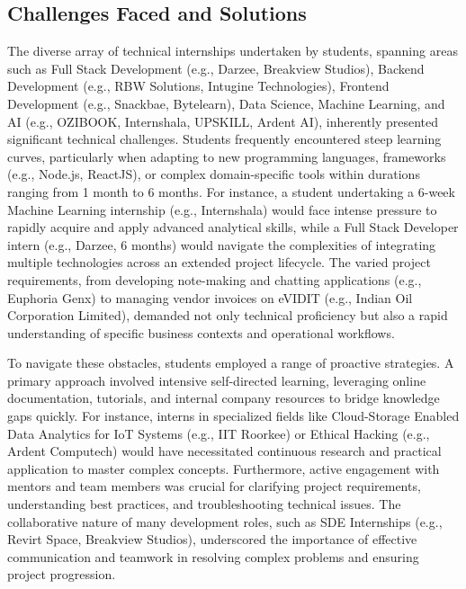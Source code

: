 \documentclass[11pt,a4paper]{article}
\newenvironment{card}{
    \begin{tcolorbox}[
        enhanced,
        colback=cardback,
        colframe=border,
        sharp corners,
        boxrule=0.5pt,
        drop shadow,
        drop shadow={shadow xshift=1mm,shadow yshift=-1mm,fill=border!50},
        boxsep=3mm,
        left=5mm, right=5mm, top=5mm, bottom=5mm,
        width=\textwidth,
        nobeforeafter
    ]
}{\end{tcolorbox}}
\begin{document}
\vspace{0.5cm}

\begin{card}
    \subsection*{\textcolor{accent}{Challenges Faced and Solutions}}
    \vspace{0.3cm}
    The diverse array of technical internships undertaken by students, spanning areas such as Full Stack Development (e.g., Darzee, Breakview Studios), Backend Development (e.g., RBW Solutions, Intugine Technologies), Frontend Development (e.g., Snackbae, Bytelearn), Data Science, Machine Learning, and AI (e.g., OZIBOOK, Internshala, UPSKILL, Ardent AI), inherently presented significant technical challenges. Students frequently encountered steep learning curves, particularly when adapting to new programming languages, frameworks (e.g., Node.js, ReactJS), or complex domain-specific tools within durations ranging from 1 month to 6 months. For instance, a student undertaking a 6-week Machine Learning internship (e.g., Internshala) would face intense pressure to rapidly acquire and apply advanced analytical skills, while a Full Stack Developer intern (e.g., Darzee, 6 months) would navigate the complexities of integrating multiple technologies across an extended project lifecycle. The varied project requirements, from developing note-making and chatting applications (e.g., Euphoria Genx) to managing vendor invoices on eVIDIT (e.g., Indian Oil Corporation Limited), demanded not only technical proficiency but also a rapid understanding of specific business contexts and operational workflows.

    To navigate these obstacles, students employed a range of proactive strategies. A primary approach involved intensive self-directed learning, leveraging online documentation, tutorials, and internal company resources to bridge knowledge gaps quickly. For instance, interns in specialized fields like Cloud-Storage Enabled Data Analytics for IoT Systems (e.g., IIT Roorkee) or Ethical Hacking (e.g., Ardent Computech) would have necessitated continuous research and practical application to master complex concepts. Furthermore, active engagement with mentors and team members was crucial for clarifying project requirements, understanding best practices, and troubleshooting technical issues. The collaborative nature of many development roles, such as SDE Internships (e.g., Revirt Space, Breakview Studios), underscored the importance of effective communication and teamwork in resolving complex problems and ensuring project progression.


\end{card}
\end{document}
